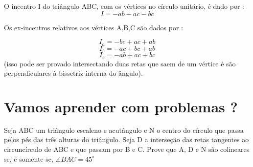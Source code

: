 \documentclass{article}
\begin{document}
\begin{tcolorbox}[colback=blue!5!white,colframe=blue!75!black,title=Incentro (círculo unitário)\emoji{nerd-face}]
O incentro I do triângulo ABC, com os vértices no círculo unitário, é dado por : 
$$I = -ab -ac  -bc$$
\end{tcolorbox}

Os ex-incentros relativos aos vértices A,B,C são dados por : 

$$I_a = -bc + ac + ab$$
$$I_b = -ac + bc + ab$$
$$I_c = -ab + ac + bc$$
(isso pode ser provado intersectando duas retas que saem de um vértice é são perpendiculares à bissetriz interna do ângulo).

\section{Vamos aprender com problemas ?}

\begin{tcolorbox}[colback=purple!5!white,colframe=purple!75!black,title=(OBM 2015 P1 N3)\emoji{nerd-face}]
Seja ABC um triângulo escaleno e acutângulo e N o centro do círculo que passa pelos pés das três alturas do
triângulo. Seja D a interseção das retas tangentes ao circuncírculo de ABC e que passam por B e C. Prove que
A, D e N são colineares se, e somente se, $\angle BAC = 45^{\circ}$

\end{tcolorbox}
\end{document}
